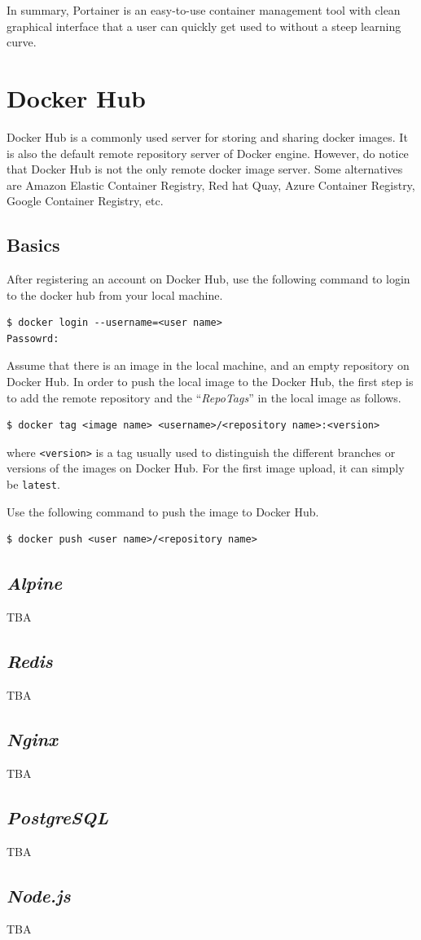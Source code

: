 In summary, Portainer is an easy-to-use container management tool with clean graphical interface that a user can quickly get used to without a steep learning curve.

\section{Docker Hub}

Docker Hub is a commonly used server for storing and sharing docker images. It is also the default remote repository server of Docker engine. However, do notice that Docker Hub is not the only remote docker image server. Some alternatives are Amazon Elastic Container Registry, Red hat Quay, Azure Container Registry, Google Container Registry, etc.

\subsection{Basics}

After registering an account on Docker Hub, use the following command to login to the docker hub from your local machine.
\begin{lstlisting}
$ docker login --username=<user name>
Passowrd:
\end{lstlisting}

Assume that there is an image in the local machine, and an empty repository on Docker Hub. In order to push the local image to the Docker Hub, the first step is to add the remote repository and the ``\textit{RepoTags}'' in the local image as follows.
\begin{lstlisting}
$ docker tag <image name> <username>/<repository name>:<version>
\end{lstlisting}
where \verb|<version>| is a tag usually used to distinguish the different branches or versions of the images on Docker Hub. For the first image upload, it can simply be \verb|latest|.

Use the following command to push the image to Docker Hub.
\begin{lstlisting}
$ docker push <user name>/<repository name>
\end{lstlisting}

\subsection{\textit{Alpine}}

TBA

\subsection{\textit{Redis}}

TBA

\subsection{\textit{Nginx}}

TBA

\subsection{\textit{PostgreSQL}}

TBA

\subsection{\textit{Node.js}}

TBA


